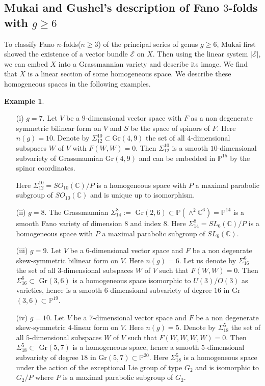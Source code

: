 \documentclass[11pt]{amsart}
\theoremstyle{plain}
\theoremstyle{definition}
\newtheorem{example}[theorem]{Example}
\theoremstyle{expl}
\begin{document}
\subsection{Mukai and Gushel's description of Fano $3$-folds with $g\geq 6$}
To classify Fano $n$-folds($n\geq 3$) of the principal series of genus $g \geq 6$, Mukai first showed the existence of a vector bundle $\mathcal{E}$ on $X$. Then using the linear system $|\mathcal{E}|$, we can embed $X$ into a Grassmannian variety and describe its image. We find that $X$ is a linear section of some homogeneous space. We describe these homogeneous spaces in the following examples.
\begin{example}\begin{enumerate}\item[(i)] $g=7$. Let $V$ be a $9$-dimensional vector space with $F$ as a non degenerate symmetric bilinear form on $V$ and $S$ be the space of spinors of $F$. Here $n(g)=10$. Denote by $\Sigma_{12}^{10} \subset $Gr$(4,9)$ the set of all $4$-dimensional subspaces $W$ of $V$ with $F(W,W)=0$. Then $\Sigma_{12}^{10}$ is a smooth $10$-dimensional subvariety of Grassmannian Gr$(4,9)$ and can be embedded in $\mathbb{P}^{15}$ by the spinor coordinates. 

Here $\Sigma^{10}_{12} = SO_{10}(\mathbb{C})/P$ is a homogeneous space with $P$ a maximal parabolic subgroup of $SO_{10}(\mathbb{C})$ and is unique up to isomorphism.
\item[(ii)] $g=8$. The Grassmannian $\Sigma^8_{14}:=$ Gr$(2,6) \subset \mathbb{P}(\wedge^2 \mathbb{C}^6) = \mathbb{P}^{14}$ is a smooth Fano variety of dimension $8$ and index $8$.  Here $\Sigma^8_{14} = SL_6(\mathbb{C})/P$ is a homogeneous space with $P$ a maximal parabolic subgroup of $SL_6(\mathbb{C})$.
      \item[(iii)] $g=9$. Let $V$ be a $6$-dimensional vector space and $F$ be a non degenrate skew-symmetric bilinear form on $V$. Here $n(g)=6$. Let us denote by $\Sigma_{16}^6$ the set of all $3$-dimensional subspaces $W$ of $V$ such that $F(W,W)=0$. Then $\Sigma_{16}^6 \subset $ Gr$(3,6)$ is a homogeneous space isomorphic to $U(3)/O(3)$ as varieties, hence is a smooth $6$-dimensional subvariety of degree $16$ in Gr$(3,6)\subset  \mathbb{P}^{19}$.
            \item[(iv)] $g=10$. Let $V$ be a $7$-dimensional vector space and $F$ be a non degenerate skew-symmetric $4$-linear form on $V$. Here $n(g)=5$. Denote by $\Sigma_{18}^5$ the set of all $5$-dimensional subspaces $W$ of $V$ such that $F(W,W,W,W)=0$. Then $\Sigma_{18}^5 \subset $ Gr$(5,7)$ is a homogeneous space, hence a smooth $5$-dimensional subvariety of degree $18$ in Gr$(5,7) \subset \mathbb{P}^{20}$. Here $\Sigma^5_{18}$ is a homogeneous space under the action of the exceptional Lie group of type $G_2$ and is isomorphic to $G_2/P$ where $P$ is a maximal parabolic subgroup of $G_2$.
            

\end{enumerate}
\end{example}
\end{document}
